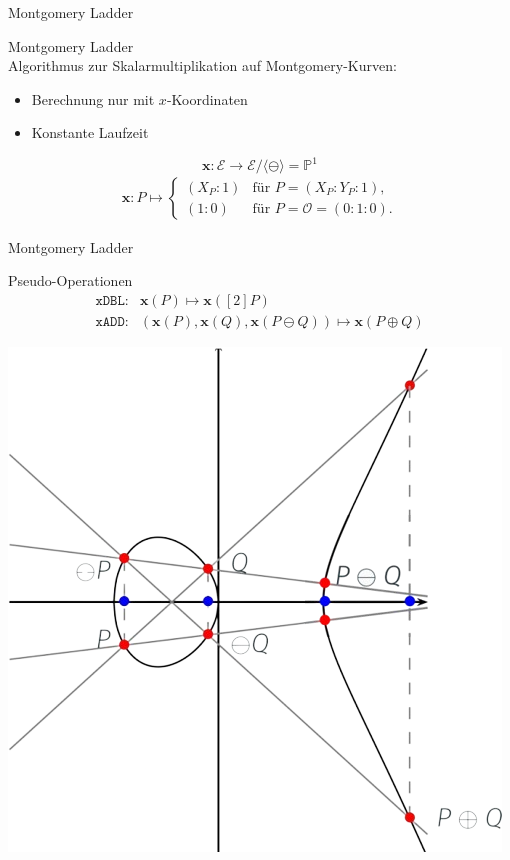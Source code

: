 \begin{frame}{Montgomery Ladder}
    \begin{definitionblock}{Montgomery Ladder}
        \\Algorithmus zur Skalarmultiplikation auf Montgomery-Kurven:
        \begin{itemize}
            \item Berechnung nur mit $x$-Koordinaten
            \item Konstante Laufzeit
        \end{itemize}
    \end{definitionblock}
    \vspace{2em}
    \[\textbf{x}:\mathcal{E}\rightarrow \mathcal{E}/\langle\ominus\rangle=\mathbb{P}^1\]
    \begin{align*}
    \textbf{x}: P \longmapsto
    \begin{cases}
        (X_P:1) & \text{für } P = (X_P:Y_P:1), \\
        (1:0) & \text{für } P = \mathcal{O} = (0:1:0).
    \end{cases}
\end{align*}
\end{frame}
\begin{frame}{Montgomery Ladder}
   
        
        
            \begin{definitionblock}{Pseudo-Operationen}
                \vspace{-1em}
                \begin{align*}
                    \texttt{xDBL:}&\textbf{x}(P)\longmapsto \textbf{x}([2]P) \\
                    \texttt{xADD:}&(\textbf{x}(P),\textbf{x}(Q),\textbf{x}(P\ominus Q))\longmapsto \textbf{x}(P\oplus Q)
                \end{align*}
                
            \end{definitionblock}
            \begin{center}
               \includegraphics[width=0.35\linewidth]{img/x_cor} 
            \end{center}
       
\end{frame}
